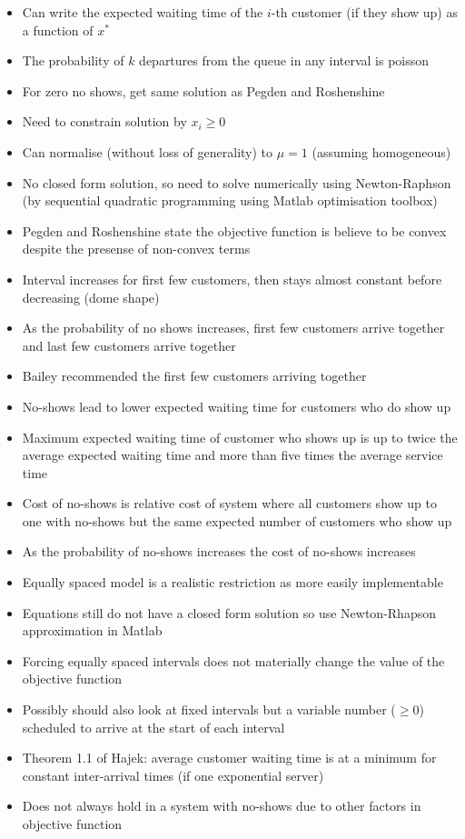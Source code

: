\documentclass{article}
\begin{document}
\begin{itemize}
    \item Can write the expected waiting time of the $i$-th customer (if they show up) as a function of $x^{*}$
    \item The probability of $k$ departures from the queue in any interval is poisson
    \item For zero no shows, get same solution as Pegden and Roshenshine
    \item Need to constrain solution by $x_{i} \geq 0$
    \item Can normalise (without loss of generality) to $\mu = 1$ (assuming homogeneous)
    \item No closed form solution, so need to solve numerically using Newton-Raphson (by sequential quadratic programming using Matlab optimisation toolbox)
    \item Pegden and Roshenshine state the objective function is believe to be convex despite the presense of non-convex terms
    \item Interval increases for first few customers, then stays almost constant before decreasing (dome shape)
    \item As the probability of no shows increases, first few customers arrive together and last few customers arrive together
    \item Bailey recommended the first few customers arriving together
    \item No-shows lead to lower expected waiting time for customers who do show up
    \item Maximum expected waiting time of customer who shows up is up to twice the average expected waiting time and more than five times the average service time
    \item Cost of no-shows is relative cost of system where all customers show up to one with no-shows but the same expected number of customers who show up
    \item As the probability of no-shows increases the cost of no-shows increases
    \item Equally spaced model is a realistic restriction as more easily implementable
    \item Equations still do not have a closed form solution so use Newton-Rhapson approximation in Matlab
    \item Forcing equally spaced intervals does not materially change the value of the objective function
    \item Possibly should also look at fixed intervals but a variable number ($\geq 0$) scheduled to arrive at the start of each interval
    \item Theorem 1.1 of Hajek: average customer waiting time is at a minimum for constant inter-arrival times (if one exponential server)
    \item Does not always hold in a system with no-shows due to other factors in objective function
\end{itemize}
\end{document}
